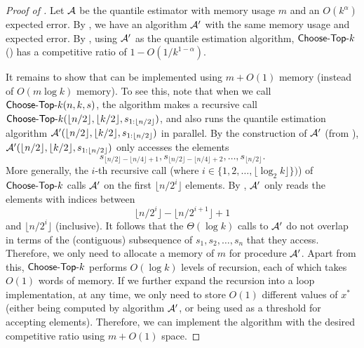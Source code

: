 \begin{proof}[Proof of ]
    Let $\mathcal{A}$ be the quantile estimator with memory usage $m$ and an $O(k^{\alpha})$ expected error. By , we have an algorithm $\mathcal{A}'$ with the same memory usage and expected error. By , using $\mathcal{A}'$ as the quantile estimation algorithm, $\textsf{Choose-Top-}k$ () has a competitive ratio of $1 - O(1/k^{1-\alpha})$.

    It remains to show that  can be implemented using $m + O(1)$ memory (instead of $O(m\log k)$ memory). To see this, note that when we call $\textsf{Choose-Top-}k(n, k, s)$, the algorithm makes a recursive call $\textsf{Choose-Top-}k(\lfloor n / 2\rfloor, \lfloor k/2\rfloor, s_{1:\lfloor n / 2\rfloor})$, and also runs the quantile estimation algorithm $\mathcal{A}'(\lfloor n / 2\rfloor, \lfloor k/2\rfloor, s_{1:\lfloor n / 2\rfloor})$ in parallel. By the construction of $\mathcal{A}'$ (from ), $\mathcal{A}'(\lfloor n / 2\rfloor, \lfloor k/2\rfloor, s_{1:\lfloor n / 2\rfloor})$ only accesses the elements 
    \[
        s_{\lfloor n / 2\rfloor - \lfloor n / 4\rfloor + 1}, s_{\lfloor n / 2\rfloor - \lfloor n / 4\rfloor + 2}, \ldots, s_{\lfloor n / 2\rfloor}.
    \]
    More generally, the $i$-th recursive call (where $i \in \{1, 2, \ldots, \lfloor \log_2 k\rfloor\})$) of $\textsf{Choose-Top-}k$ calls $\mathcal{A}'$ on the first $\lfloor n/2^i\rfloor$ elements. By , $\mathcal{A}'$ only reads the elements with indices between
    \[
        \lfloor n / 2^i\rfloor - \lfloor n / 2^{i+1}\rfloor + 1
    \]
    and $\lfloor n / 2^i\rfloor$ (inclusive). It follows that the $\Theta(\log k)$ calls to $\mathcal{A}'$ do not overlap in terms of the (contiguous) subsequence of $s_1, s_2, \ldots, s_n$ that they access. Therefore, we only need to allocate a memory of $m$ for procedure $\mathcal{A}'$. Apart from this, $\textsf{Choose-Top-}k$ performs $O(\log k)$ levels of recursion, each of which takes $O(1)$ words of memory. If we further expand the recursion into a loop implementation, at any time, we only need to store $O(1)$ different values of $x^*$ (either being computed by algorithm $\mathcal{A}'$, or being used as a threshold for accepting elements). Therefore, we can implement the algorithm with the desired competitive ratio using $m + O(1)$ space.
\end{proof}